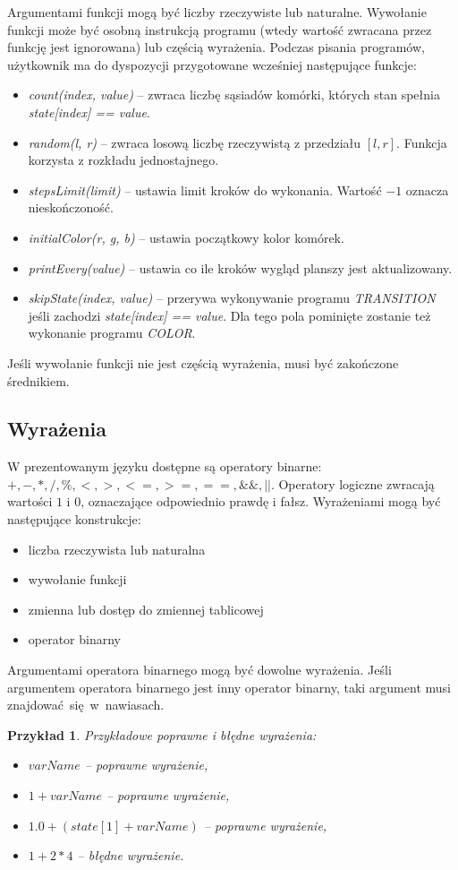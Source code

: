 \documentclass[declaration,shortabstract, inz]{iithesis}
\theoremstyle{definition} \newtheorem{definition}{Definicja}[]
\theoremstyle{plain} \newtheorem{remark}[definition]{Obserwacja}
\theoremstyle{plain} \newtheorem{theorem}[definition]{Twierdzenie}
\theoremstyle{plain} \newtheorem{example}{Przykład}[definition]
\theoremstyle{plain} \newtheorem{lemma}[definition]{Lemat}
\begin{document}
Argumentami funkcji mogą być liczby rzeczywiste lub naturalne. Wywołanie funkcji może być osobną instrukcją programu (wtedy wartość zwracana przez funkcję jest ignorowana) lub częścią wyrażenia.
Podczas pisania programów, użytkownik ma do dyspozycji przygotowane wcześniej następujące funkcje:
\begin{itemize}
\item \textit{count(index, value)} -- zwraca liczbę sąsiadów komórki, których stan spełnia \textit{state[index] == value}.
\item \textit{random(l, r)} -- zwraca losową liczbę rzeczywistą z przedziału $[l, r]$. Funkcja korzysta z rozkładu jednostajnego.
\item \textit{stepsLimit(limit)} -- ustawia limit kroków do wykonania. Wartość $-1$ oznacza nieskończoność.
\item \textit{initialColor(r, g, b)} -- ustawia początkowy kolor komórek.
\item \textit{printEvery(value)} -- ustawia co ile kroków wygląd planszy jest aktualizowany.
\item \textit{skipState(index, value)} -- przerywa wykonywanie programu \textit{TRANSITION} jeśli zachodzi \textit{state[index] == value}. Dla tego pola pominięte zostanie też wykonanie programu \textit{COLOR}.
\end{itemize}

Jeśli wywołanie funkcji nie jest częścią wyrażenia, musi być zakończone średnikiem.

\subsection{Wyrażenia}
W prezentowanym języku dostępne są operatory binarne: $+, -, * , /, \%, <, >, <=, >=, ==, \&\&, ||$.
Operatory logiczne zwracają wartości $1$ i $0$, oznaczające odpowiednio prawdę i fałsz.
Wyrażeniami mogą być następujące konstrukcje:
\begin{itemize}
\item liczba rzeczywista lub naturalna
\item wywołanie funkcji
\item zmienna lub dostęp do zmiennej tablicowej
\item operator binarny
\end{itemize}
Argumentami operatora binarnego mogą być dowolne wyrażenia. Jeśli argumentem operatora binarnego jest inny operator binarny, taki argument musi znajdować~się~w~nawiasach.

\begin{example}
Przykładowe poprawne i błędne wyrażenia:
\begin{itemize}
\item $varName$ -- poprawne wyrażenie,
\item $1 + varName$ -- poprawne wyrażenie,
\item $1.0 + (state[1] + varName)$ -- poprawne wyrażenie,
\item $1 + 2 * 4$ -- błędne wyrażenie.
\end{itemize}
\end{example}
\end{document}

